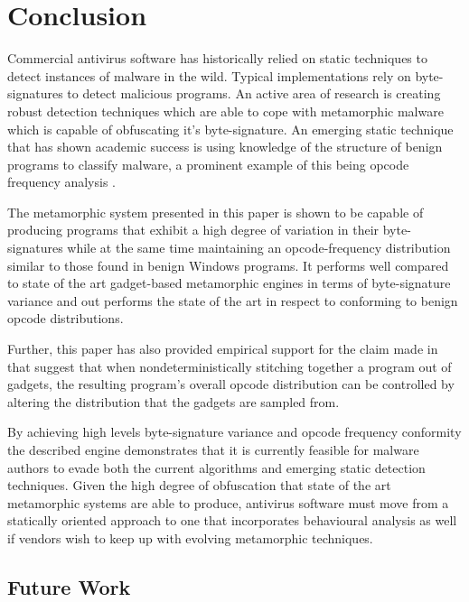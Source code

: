 \chapter{Conclusion}

    Commercial antivirus software has historically relied on static techniques
    to detect instances of malware in the wild. Typical implementations rely on
    byte-signatures to detect malicious programs. An active area of research is
    creating robust detection techniques which are able to cope with metamorphic
    malware which is capable of obfuscating it's byte-signature. An emerging
    static technique that has shown academic success is using knowledge of the
    structure of benign programs to classify malware, a prominent example of
    this being opcode frequency analysis \cite{chisquared}.

    The metamorphic system presented in this paper is shown to be capable of
    producing programs that exhibit a high degree of variation in their
    byte-signatures while at the same time maintaining an opcode-frequency
    distribution similar to those found in benign Windows programs. It performs
    well compared to state of the art gadget-based metamorphic engines in terms
    of byte-signature variance and out performs the state of the art in respect
    to conforming to benign opcode distributions.

    Further, this paper has also provided empirical support for the claim made
    in \cite{franken} that suggest that when nondeterministically stitching
    together a program out of gadgets, the resulting program's overall opcode
    distribution can be controlled by altering the distribution that the gadgets
    are sampled from.

    By achieving high levels byte-signature variance and opcode frequency
    conformity the described engine demonstrates that it is currently feasible
    for malware authors to evade both the current algorithms and emerging static
    detection techniques. Given the high degree of obfuscation that state of the
    art metamorphic systems are able to produce, antivirus software must move
    from a statically oriented approach to one that incorporates behavioural
    analysis as well if vendors wish to keep up with evolving metamorphic
    techniques.

    \section{Future Work}

